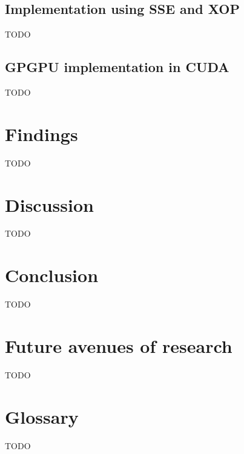  \subsection{Implementation using SSE and XOP} 
  {\color{red}TODO}
 \subsection{GPGPU implementation in CUDA}
  {\color{red}TODO}
\section{Findings}
{\color{red}TODO}
\section{Discussion}
{\color{red}TODO}
\section{Conclusion}
{\color{red}TODO}
\section{Future avenues of research}
{\color{red}TODO}
\section{Glossary}
{\color{red}TODO}


